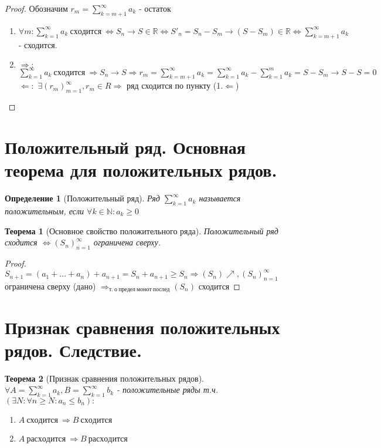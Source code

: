 \documentclass[11pt,a4paper,titlepage]{article}
\newtheorem*{theorem}{Теорема}
\newtheorem*{definition}{Определение}
\renewcommand{\implies}{\Rightarrow}
\newcommand{\bimplies}{\Leftarrow}
\renewcommand{\iff}{\Leftrightarrow}
\newcommand{\R}{\mathbb{R}}
\newcommand{\N}{\mathbb{N}}
\begin{document}
    \begin{proof}
        Обозначим $r_m = \sum_{k=m+1}^\infty a_k$ - остаток
        \begin{enumerate}
            \item $\forall m: \sum_{k=1}^\infty a_k\ сходится\ \iff S_n \to S \in \R \iff S'_n = S_n - S_m \to (S - S_m) \in \R \iff \sum_{k=m+1}^\infty a_k$ - сходится.
            \item $\implies:$ $\sum_{k=1}^\infty a_k\ сходится\ \implies S_n \to S \implies r_m = \sum_{k=m+1}^\infty a_k = \sum_{k=1}^\infty a_k - \sum_{k=1}^m a_k = S - S_m \to S - S = 0$\\
            $\bimplies:$ $\exists (r_m)_{m=1}^\infty, r_m \in R \implies$ ряд сходится по пункту (1.$\bimplies$)
        \end{enumerate}
    \end{proof}


    \section{Положительный ряд. Основная теорема для положительных рядов.}

    \begin{definition}[Положительный ряд]
        Ряд $\sum_{k=1}^\infty a_k$ называется положительным, если $\forall k \in \N: a_k \geq 0$
    \end{definition}

    \begin{theorem}[Основное свойство положительного ряда]
        Положительный ряд сходится $\iff (S_n)_{n=1}^\infty$ ограничена сверху.
    \end{theorem}

    \begin{proof}
        $S_{n+1} = (a_1 + ... + a_n) + a_{n+1} = S_n + a_{n+1} \geq S_n \implies (S_n)\nearrow, (S_n)_{n=1}^\infty$ ограничена сверху (дано) $\implies_{т.\ о\ предел\ монот\ послед} (S_n)$ сходится
    \end{proof}


    \section{Признак сравнения положительных рядов. Следствие.}

    \begin{theorem}[Признак сравнения положительных рядов]
        $\forall A = \sum_{k=1}^\infty a_k, B = \sum_{k=1}^\infty b_k$ - положительные ряды т.ч. $(\exists N: \forall n \geq N: a_n \leq b_n):$\\
        \begin{enumerate}
            \item $A\ сходится\ \implies B\ сходится$
            \item $A\ расходится\ \implies B\ расходится$
        \end{enumerate}
    \end{theorem}
\end{document}
